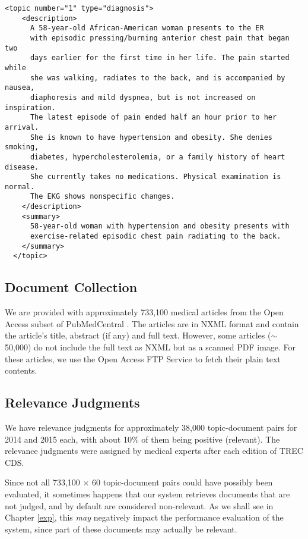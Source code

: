 \begin{Verbatim}[fontsize=\small]
  <topic number="1" type="diagnosis">
    <description>
      A 58-year-old African-American woman presents to the ER
      with episodic pressing/burning anterior chest pain that began two
      days earlier for the first time in her life. The pain started while
      she was walking, radiates to the back, and is accompanied by nausea,
      diaphoresis and mild dyspnea, but is not increased on inspiration.
      The latest episode of pain ended half an hour prior to her arrival.
      She is known to have hypertension and obesity. She denies smoking,
      diabetes, hypercholesterolemia, or a family history of heart disease.
      She currently takes no medications. Physical examination is normal.
      The EKG shows nonspecific changes.
    </description>
    <summary>
      58-year-old woman with hypertension and obesity presents with
      exercise-related episodic chest pain radiating to the back.
    </summary>
  </topic>
\end{Verbatim}

\subsection{Document Collection}
We are provided with approximately 733,100 medical articles from the Open Access subset of PubMedCentral \cite{oa}.
The articles are in NXML format
and contain the article's title, abstract (if any) and full text.
However, some articles ($\sim$ 50,000) do not include the full text
as NXML but as a scanned PDF image.
For these articles, we use the Open Access FTP Service \cite{oa-ftp} to fetch their plain text contents.

\subsection{Relevance Judgments}\label{qrels}
We have relevance judgments for approximately 38,000 topic-document pairs for 2014 and 2015 each, with about 10\% of them
being positive (relevant). The relevance judgments were assigned by medical experts after each edition of TREC CDS.

Since not all 733,100 $\times$ 60 topic-document pairs could have possibly been evaluated, it sometimes happens that our system retrieves documents
that are not judged, and by default are considered non-relevant. As we shall see in Chapter \ref{exp}, this \emph{may} negatively impact the performance evaluation of
the system, since part of these documents may actually be relevant.

